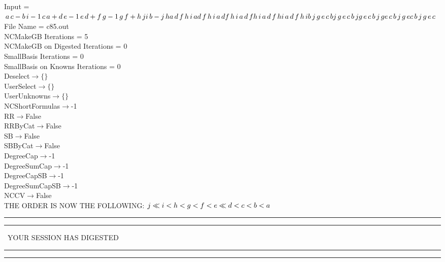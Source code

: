 \documentclass[rep10,leqno]{report}
\begin{document}
\normalsize
\baselineskip=12pt
\noindent
Input = 
$
\\a\,
 c - b\,
 i\\
-1\,
 c\,
 a + d\,
 e\\
-1\,
 e\,
 d + f\,
 g\\
-1\,
 g\,
 f + h\,
 j\\
i\,
 b - j\,
 h\\
a\,
 d\,
 f\,
 h\,
 i\,
 a\\
d\,
 f\,
 h\,
 i\,
 a\,
 d\\
f\,
 h\,
 i\,
 a\,
 d\,
 f\\
h\,
 i\,
 a\,
 d\,
 f\,
 h\\
i\,
 a\,
 d\,
 f\,
 h\,
 i\\
b\,
 j\,
 g\,
 e\,
 c\,
 b\\
j\,
 g\,
 e\,
 c\,
 b\,
 j\\
g\,
 e\,
 c\,
 b\,
 j\,
 g\\
e\,
 c\,
 b\,
 j\,
 g\,
 e\\
c\,
 b\,
 j\,
 g\,
 e\,
 c\\
$
File Name = c85.out\\
NCMakeGB Iterations = 5\\
NCMakeGB on Digested Iterations = 0\\
SmallBasis Iterations = 0\\
SmallBasis on Knowns Iterations = 0\\
Deselect$\rightarrow \{\}$\\
UserSelect$\rightarrow \{\}$\\
UserUnknowns$\rightarrow \{\}$\\
NCShortFormulas$\rightarrow$-1\\
RR$\rightarrow $False\\
RRByCat$\rightarrow $False\\
SB$\rightarrow $False\\
SBByCat$\rightarrow $False\\
DegreeCap$\rightarrow $-1\\
DegreeSumCap$\rightarrow $-1\\
DegreeCapSB$\rightarrow $-1\\
DegreeSumCapSB$\rightarrow $-1\\
NCCV$\rightarrow $False\\
THE ORDER IS NOW THE FOLLOWING:\hfil\break
$
j\ll
i<h<g<f<e\ll
d<c<b<a\\
$
\rule[2pt]{6in}{4pt}\hfil\break
\rule[2pt]{1.879in}{4pt}
\ YOUR SESSION HAS DIGESTED\ 
\rule[2pt]{1.879in}{4pt}\hfil\break
\rule[2pt]{1.923in}{4pt}
\end{document}
